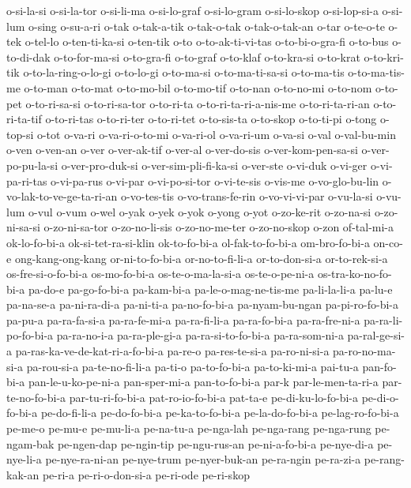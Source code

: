 {o-si-la-si o-si-la-tor o-si-li-ma o-si-lo-graf o-si-lo-gram o-si-lo-skop
o-si-lop-si-a o-si-lum o-sing o-su-a-ri o-tak o-tak-a-tik o-tak-o-tak
o-tak-o-tak-an o-tar o-te-o-te o-tek o-tel-lo o-ten-ti-ka-si o-ten-tik
o-to o-to-ak-ti-vi-tas o-to-bi-o-gra-fi o-to-bus o-to-di-dak
o-to-for-ma-si o-to-gra-fi o-to-graf o-to-klaf o-to-kra-si o-to-krat
o-to-kri-tik o-to-la-ring-o-lo-gi o-to-lo-gi o-to-ma-si o-to-ma-ti-sa-si
o-to-ma-tis o-to-ma-tis-me o-to-man o-to-mat o-to-mo-bil o-to-mo-tif
o-to-nan o-to-no-mi o-to-nom o-to-pet o-to-ri-sa-si o-to-ri-sa-tor
o-to-ri-ta o-to-ri-ta-ri-a-nis-me o-to-ri-ta-ri-an o-to-ri-ta-tif
o-to-ri-tas o-to-ri-ter o-to-ri-tet o-to-sis-ta o-to-skop o-to-ti-pi
o-tong o-top-si o-tot o-va-ri o-va-ri-o-to-mi o-va-ri-ol o-va-ri-um
o-va-si o-val o-val-bu-min o-ven o-ven-an o-ver o-ver-ak-tif o-ver-al
o-ver-do-sis o-ver-kom-pen-sa-si o-ver-po-pu-la-si o-ver-pro-duk-si
o-ver-sim-pli-fi-ka-si o-ver-ste o-vi-duk o-vi-ger o-vi-pa-ri-tas
o-vi-pa-rus o-vi-par o-vi-po-si-tor o-vi-te-sis o-vis-me o-vo-glo-bu-lin
o-vo-lak-to-ve-ge-ta-ri-an o-vo-tes-tis o-vo-trans-fe-rin o-vo-vi-vi-par
o-vu-la-si o-vu-lum o-vul o-vum o-wel o-yak o-yek o-yok o-yong o-yot
o-zo-ke-rit o-zo-na-si o-zo-ni-sa-si o-zo-ni-sa-tor o-zo-no-li-sis
o-zo-no-me-ter o-zo-no-skop o-zon of-tal-mi-a ok-lo-fo-bi-a
ok-si-tet-ra-si-klin ok-to-fo-bi-a ol-fak-to-fo-bi-a om-bro-fo-bi-a
on-co-e ong-kang-ong-kang or-ni-to-fo-bi-a or-no-to-fi-li-a or-to-don-si-a
or-to-rek-si-a os-fre-si-o-fo-bi-a os-mo-fo-bi-a os-te-o-ma-la-si-a
os-te-o-pe-ni-a os-tra-ko-no-fo-bi-a pa-do-e pa-go-fo-bi-a pa-kam-bi-a
pa-le-o-mag-ne-tis-me pa-li-la-li-a pa-lu-e pa-na-se-a pa-ni-ra-di-a
pa-ni-ti-a pa-no-fo-bi-a pa-nyam-bu-ngan pa-pi-ro-fo-bi-a pa-pu-a
pa-ra-fa-si-a pa-ra-fe-mi-a pa-ra-fi-li-a pa-ra-fo-bi-a pa-ra-fre-ni-a
pa-ra-li-po-fo-bi-a pa-ra-no-i-a pa-ra-ple-gi-a pa-ra-si-to-fo-bi-a
pa-ra-som-ni-a pa-ral-ge-si-a pa-ras-ka-ve-de-kat-ri-a-fo-bi-a pa-re-o
pa-res-te-si-a pa-ro-ni-si-a pa-ro-no-ma-si-a pa-rou-si-a pa-te-no-fi-li-a
pa-ti-o pa-to-fo-bi-a pa-to-ki-mi-a pai-tu-a pan-fo-bi-a
pan-le-u-ko-pe-ni-a pan-sper-mi-a pan-to-fo-bi-a par-k par-le-men-ta-ri-a
par-te-no-fo-bi-a par-tu-ri-fo-bi-a pat-ro-io-fo-bi-a pat-ta-e
pe-di-ku-lo-fo-bi-a pe-di-o-fo-bi-a pe-do-fi-li-a pe-do-fo-bi-a
pe-ka-to-fo-bi-a pe-la-do-fo-bi-a pe-lag-ro-fo-bi-a pe-me-o pe-mu-e
pe-mu-li-a pe-na-tu-a pe-nga-lah pe-nga-rang pe-nga-rung pe-ngam-bak
pe-ngen-dap pe-ngin-tip pe-ngu-rus-an pe-ni-a-fo-bi-a pe-nye-di-a
pe-nye-li-a pe-nye-ra-ni-an pe-nye-trum pe-nyer-buk-an pe-ra-ngin
pe-ra-zi-a pe-rang-kak-an pe-ri-a pe-ri-o-don-si-a pe-ri-ode pe-ri-skop
}
